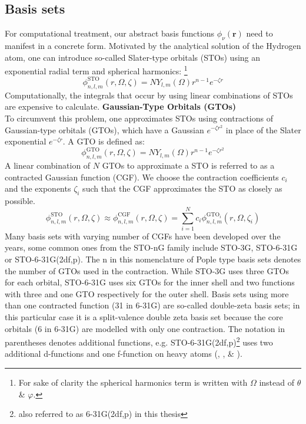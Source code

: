 \subsection{Basis sets}
\label{subsec:background_hf_basis_sets}
For computational treatment, our abstract basis functions $\phi_\nu(\mathbf{r})$ need to manifest in a concrete form. 
Motivated by the analytical solution of the Hydrogen atom, one can introduce so-called Slater-type orbitals (STOs) using an exponential radial term and spherical harmonics: \footnote{For sake of clarity the spherical harmonics term is written with $\Omega$ instead of $\theta$ \& $\varphi$.}
\begin{equation}
    \label{eq:slater_orbital}
    \phi_{n, l, m}^{\text{STO}}(r, \Omega, \zeta) = N Y_{l,m}(\Omega) r^{n-1} e^{-\zeta r}
\end{equation} 
Computationally, the integrals that occur by using linear combinations of STOs are expensive to calculate. 
\newpage
\textbf{Gaussian-Type Orbitals (GTOs)}\\
To circumvent this problem, one approximates STOs using contractions of Gaussian-type orbitals (GTOs), which have a Gaussian $e^{-\zeta r^2}$ in place of the Slater exponential $e^{-\zeta r}$. A GTO is defined as: 
\begin{equation}
    \label{eq:gaussian_orbital}
    \phi_{n, l, m}^{\text{GTO}}(r, \Omega, \zeta) = N Y_{l,m}(\Omega) r^{n-1} e^{-\zeta r^2}
\end{equation}
A linear combination of $N$ GTOs to approximate a STO is referred to as a contracted Gaussian function (CGF). We choose the contraction coefficients $c_i$ and the exponents $\zeta_i$ such that the CGF approximates the STO as closely as possible. \\
\begin{equation}
    \phi_{n, l, m}^{\text{STO}}(r, \Omega, \zeta)  \approx \phi_{n, l, m}^{\text{CGF}}(r, \Omega, \zeta) = \sum_{i=1}^N c_i \phi_{n, l, m}^{\text{GTO}_i}(r, \Omega, \zeta_i)
\end{equation}
Many basis sets with varying number of CGFs have been developed over the years, some common ones from the STO-nG family include STO-3G, STO-6-31G or STO-6-31G(2df,p). The n in this nomenclature of Pople type basis sets \parencite{ref:pople_basis} denotes the number of GTOs used in the contraction. While STO-3G uses three GTOs for each orbital, STO-6-31G uses six GTOs for the inner shell and two functions with three and one GTO respectively for the outer shell. Basis sets using more than one contracted function (31 in 6-31G) are so-called double-zeta basis sets; in this particular case it is a split-valence double zeta basis set because the core orbitals (6 in 6-31G) are modelled with only one contraction. The notation in parentheses denotes additional functions, e.g. STO-6-31G(2df,p)\footnote{also referred to as 6-31G(2df,p) in this thesis} uses two additional d-functions and one f-function on heavy atoms (, ,  \& ). 

